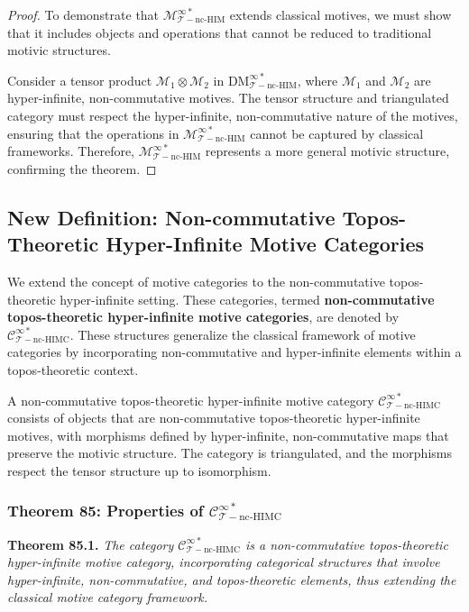 \documentclass{article}
\begin{document}
\begin{proof}
To demonstrate that \(\mathcal{M}_{\mathcal{T}-\text{nc-HIM}}^{\infty *}\) extends classical motives, we must show that it includes objects and operations that cannot be reduced to traditional motivic structures.

Consider a tensor product \(\mathcal{M}_1 \otimes \mathcal{M}_2\) in \(\text{DM}_{\mathcal{T}-\text{nc-HIM}}^{\infty *}\), where \(\mathcal{M}_1\) and \(\mathcal{M}_2\) are hyper-infinite, non-commutative motives. The tensor structure and triangulated category must respect the hyper-infinite, non-commutative nature of the motives, ensuring that the operations in \(\mathcal{M}_{\mathcal{T}-\text{nc-HIM}}^{\infty *}\) cannot be captured by classical frameworks. Therefore, \(\mathcal{M}_{\mathcal{T}-\text{nc-HIM}}^{\infty *}\) represents a more general motivic structure, confirming the theorem.
\end{proof}

\subsection{New Definition: Non-commutative Topos-Theoretic Hyper-Infinite Motive Categories}
We extend the concept of motive categories to the non-commutative topos-theoretic hyper-infinite setting. These categories, termed \textbf{non-commutative topos-theoretic hyper-infinite motive categories}, are denoted by \(\mathcal{C}_{\mathcal{T}-\text{nc-HIMC}}^{\infty *}\). These structures generalize the classical framework of motive categories by incorporating non-commutative and hyper-infinite elements within a topos-theoretic context.

A non-commutative topos-theoretic hyper-infinite motive category \(\mathcal{C}_{\mathcal{T}-\text{nc-HIMC}}^{\infty *}\) consists of objects that are non-commutative topos-theoretic hyper-infinite motives, with morphisms defined by hyper-infinite, non-commutative maps that preserve the motivic structure. The category is triangulated, and the morphisms respect the tensor structure up to isomorphism.

\subsubsection{Theorem 85: Properties of \(\mathcal{C}_{\mathcal{T}-\text{nc-HIMC}}^{\infty *}\)}
\textbf{Theorem 85.1.} \textit{The category \(\mathcal{C}_{\mathcal{T}-\text{nc-HIMC}}^{\infty *}\) is a non-commutative topos-theoretic hyper-infinite motive category, incorporating categorical structures that involve hyper-infinite, non-commutative, and topos-theoretic elements, thus extending the classical motive category framework.}
\end{document}
